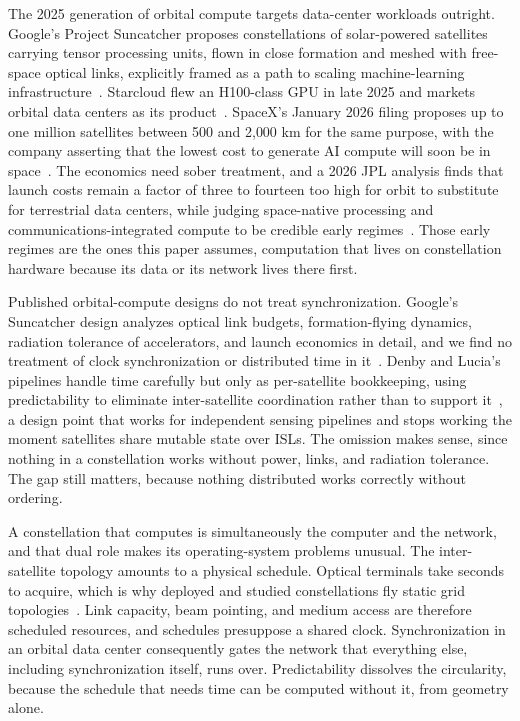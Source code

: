 \documentclass[twocolumn,10pt]{article}
\begin{document}
The 2025 generation of orbital compute targets data-center workloads outright. Google's Project Suncatcher proposes constellations of solar-powered satellites carrying tensor processing units, flown in close formation and meshed with free-space optical links, explicitly framed as a path to scaling machine-learning infrastructure~\cite{suncatcher2025}. Starcloud flew an H100-class GPU in late 2025 and markets orbital data centers as its product~\cite{starcloud2025}. SpaceX's January 2026 filing proposes up to one million satellites between 500 and 2{,}000 km for the same purpose, with the company asserting that the lowest cost to generate AI compute will soon be in space~\cite{spacenews2026}. The economics need sober treatment, and a 2026 JPL analysis finds that launch costs remain a factor of three to fourteen too high for orbit to substitute for terrestrial data centers, while judging space-native processing and communications-integrated compute to be credible early regimes~\cite{turyshev2026}. Those early regimes are the ones this paper assumes, computation that lives on constellation hardware because its data or its network lives there first.

Published orbital-compute designs do not treat synchronization. Google's Suncatcher design analyzes optical link budgets, formation-flying dynamics, radiation tolerance of accelerators, and launch economics in detail, and we find no treatment of clock synchronization or distributed time in it~\cite{suncatcher2025}. Denby and Lucia's pipelines handle time carefully but only as per-satellite bookkeeping, using predictability to eliminate inter-satellite coordination rather than to support it~\cite{denby2020}, a design point that works for independent sensing pipelines and stops working the moment satellites share mutable state over ISLs. The omission makes sense, since nothing in a constellation works without power, links, and radiation tolerance. The gap still matters, because nothing distributed works correctly without ordering.

A constellation that computes is simultaneously the computer and the network, and that dual role makes its operating-system problems unusual. The inter-satellite topology amounts to a physical schedule. Optical terminals take seconds to acquire, which is why deployed and studied constellations fly static grid topologies~\cite{pfandzelter2023,bhattacherjee2019}. Link capacity, beam pointing, and medium access are therefore scheduled resources, and schedules presuppose a shared clock. Synchronization in an orbital data center consequently gates the network that everything else, including synchronization itself, runs over. Predictability dissolves the circularity, because the schedule that needs time can be computed without it, from geometry alone.
\end{document}
